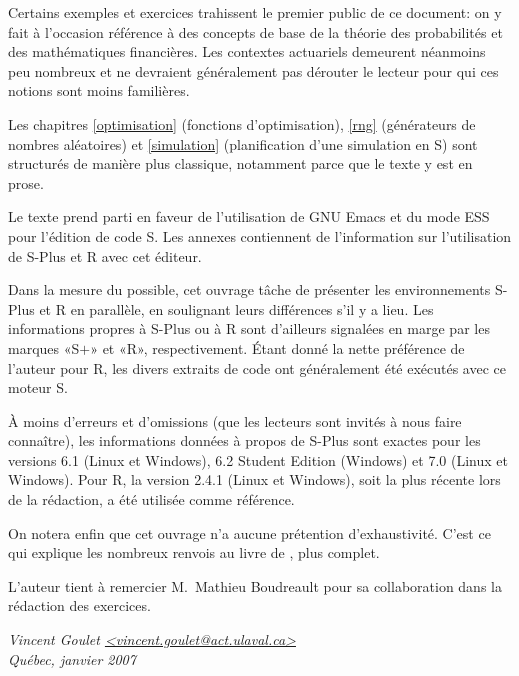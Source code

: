 Certains exemples et exercices trahissent le premier public de ce
document: on y fait à l'occasion référence à des concepts de base de
la théorie des probabilités et des mathématiques financières. Les
contextes actuariels demeurent néanmoins peu nombreux et ne devraient
généralement pas dérouter le lecteur pour qui ces notions sont moins
familières.

Les chapitres \ref{optimisation} (fonctions d'optimisation), \ref{rng}
(générateurs de nombres aléatoires) et \ref{simulation} (planification
d'une simulation en S) sont structurés de manière plus classique,
notamment parce que le texte y est en prose.

Le texte prend parti en faveur de l'utilisation de GNU Emacs et du
mode ESS pour l'édition de code S.  Les annexes contiennent de
l'information sur l'utilisation de S-Plus et \textsf{R} avec cet
éditeur.

Dans la mesure du possible, cet ouvrage tâche de présenter les
environnements S-Plus et \textsf{R} en parallèle, en soulignant leurs
différences s'il y a lieu. Les informations propres à S-Plus ou à
\textsf{R} sont d'ailleurs signalées en marge par les marques «S$+$»
et «\textsf{R}», respectivement. Étant donné la nette préférence de
l'auteur pour \textsf{R}, les divers extraits de code ont généralement
été exécutés avec ce moteur S.

À moins d'erreurs et d'omissions (que les lecteurs sont invités à nous
faire connaître), les informations données à propos de S-Plus sont
exactes pour les versions 6.1 (Linux et Windows), 6.2 Student Edition
(Windows) et 7.0 (Linux et Windows). Pour \textsf{R}, la version 2.4.1
(Linux et Windows), soit la plus récente lors de la rédaction, a été
utilisée comme référence.

On notera enfin que cet ouvrage n'a aucune prétention d'exhaustivité.
C'est ce qui explique les nombreux renvois au livre de \cite{MASS},
plus complet.

L'auteur tient à remercier M.~Mathieu Boudreault pour sa collaboration
dans la rédaction des exercices.

\begin{flushright}
  \itshape
  Vincent Goulet \url{<vincent.goulet@act.ulaval.ca>} \\
  Québec, janvier 2007
\end{flushright}



